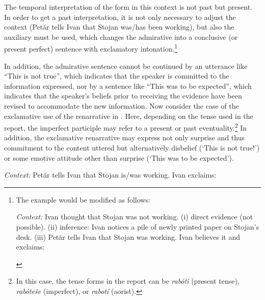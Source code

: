 \documentclass[output=paper,
colorlinks,
citecolor=brown,
newtxmath
]{langscibook}
\begin{document}
\noindent The temporal interpretation of the form in this context is not past but present. In order to get a past interpretation, it is not only necessary to adjust the context (Petăr tells Ivan that Stojan was/has been working), but also the auxiliary must be used, which changes the admirative into a conclusive (or present perfect) sentence with exclamatory intonation.\footnote{The example would be modified as follows:

\eanoraggedright
\textit{Context:} Ivan thought that Stojan was not working. (i) direct evidence (not possible).
(ii) inference: Ivan notices a pile of newly printed paper on Stojan's desk.
(iii) Petăr tells Ivan that Stojan was working. Ivan believes it and exclaims:\vspace{-6pt}
\z
\begin{exe}
\end{exe}}

    \largerpage[2]

In addition, the admirative sentence cannot be continued by an utterance like ``This is not true'', which indicates that the speaker is committed to the information expressed, nor by a sentence like ``This was to be expected'', which indicates that the speaker's beliefs prior to receiving the evidence have been revised to accommodate the new information.
Now consider the case of the exclamative use of the renarrative in . Here, depending on the tense used in the report, the imperfect participle may refer to a present or past eventuality.\footnote{In this case, the tense forms in the report can be \textit{rabóti} (present tense), \textit{rabóteše} (imperfect), or \textit{rabotí} (aorist).} In addition, the exclamative renarrative may express not only surprise and thus commitment to the content uttered but alternatively disbelief (`This is not true!') or some emotive attitude other than surprise (`This was to be expected').

\eanoraggedright\label{ex:renarr-excl}
\textit{Context:} Petăr tells Ivan that Stojan is/was working.
Ivan exclaims:\vspace{-6pt}
\z
\begin{exe}
\end{exe}
\end{document}
